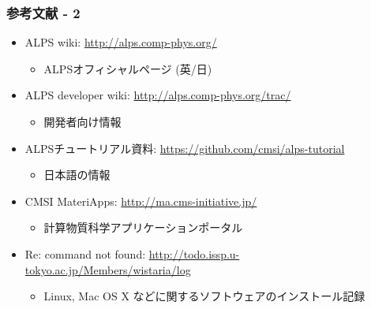 \begin{frame}
  \frametitle{参考文献 - 2}
  \begin{itemize}
  \item ALPS wiki: \url{http://alps.comp-phys.org/}
    \begin{itemize}
      \item ALPSオフィシャルページ (英/日)
    \end{itemize}
  \item ALPS developer wiki: \url{http://alps.comp-phys.org/trac/}
    \begin{itemize}
      \item 開発者向け情報
    \end{itemize}
  \item ALPSチュートリアル資料: \url{https://github.com/cmsi/alps-tutorial}
    \begin{itemize}
      \item 日本語の情報
    \end{itemize}
  \item CMSI MateriApps: \url{http://ma.cms-initiative.jp/}
    \begin{itemize}
      \item 計算物質科学アプリケーションポータル
    \end{itemize}
  \item Re: command not found: \url{http://todo.issp.u-tokyo.ac.jp/Members/wistaria/log}
    \begin{itemize}
      \item Linux, Mac OS X などに関するソフトウェアのインストール記録
    \end{itemize}
  \end{itemize}
\end{frame}


